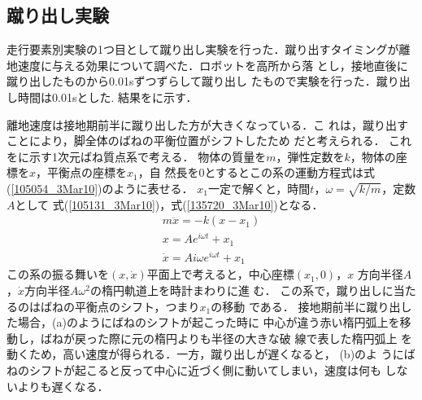 \documentclass[10pt,a4paper]{jsarticle}
\begin{document}






\subsection{蹴り出し実験}

走行要素別実験の1つ目として蹴り出し実験を行った．蹴り出すタイミングが離地速度に与える効果について調べた．ロボットを高所から落
とし，接地直後に蹴り出したものから0.01sずつずらして蹴り出し
たもので実験を行った．蹴り出し時間は0.01sとした.
結果をに示す．


離地速度は接地期前半に蹴り出した方が大きくなっている．こ
れは，蹴り出すことにより，脚全体のばねの平衡位置がシフトしたため
だと考えられる．
これをに示す1次元ばね質点系で考える．
物体の質量を$m$，弾性定数を$k$，物体の座標を$x$，平衡点の座標を$x_1$，自
然長を0とするとこの系の運動方程式は式(\ref{105054_3Mar10})のように表せる．
$x_{1}$一定で解くと，時間$t$，$\omega=\sqrt{k/m}$，定数$A$として
式(\ref{105131_3Mar10})，式(\ref{135720_3Mar10})となる．
\begin{align}
 m\ddot{x}=-k(x-x_{1})\label{105054_3Mar10}\\
 x=Ae^{i\omega t}+x_{1}\label{105131_3Mar10}\\
 \dot{x}=Ai\omega e^{i\omega t}+x_{1}\label{135720_3Mar10}
\end{align}
この系の振る舞いを$(x,\dot{x})$平面上で考えると，中心座標$(x_1,0)$，$x$
方向半径$A$，$\dot{x}$方向半径$A\omega^{2}$の楕円軌道上を時計まわりに進
む．
この系で，蹴り出しに当たるのはばねの平衡点のシフト，つまり$x_{1}$の移動
である．
接地期前半に蹴り出した場合，(a)のようにばねのシフトが起こった時に
中心が違う赤い楕円弧上を移動し，ばねが戻った際に元の楕円よりも半径の大きな破
線で表した楕円弧上
を動くため，高い速度が得られる．一方，蹴り出しが遅くなると，
(b)のよ
うにばねのシフトが起こると反って中心に近づく側に動いてしまい，速度は何も
しないよりも遅くなる．
\end{document}
